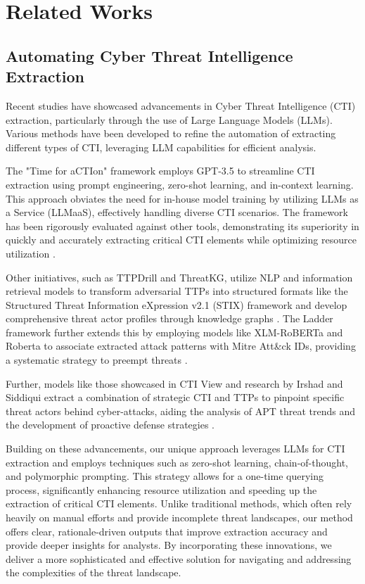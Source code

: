 \section{Related Works}
\label{sec:relatedworks}
\subsection{Automating Cyber Threat Intelligence Extraction}
Recent studies have showcased advancements in Cyber Threat Intelligence (CTI) extraction, particularly through the use of Large Language Models (LLMs). Various methods have been developed to refine the automation of extracting different types of CTI, leveraging LLM capabilities for efficient analysis.

The "Time for aCTIon" framework employs GPT-3.5 to streamline CTI extraction using prompt engineering, zero-shot learning, and in-context learning. This approach obviates the need for in-house model training by utilizing LLMs as a Service (LLMaaS), effectively handling diverse CTI scenarios. The framework has been rigorously evaluated against other tools, demonstrating its superiority in quickly and accurately extracting critical CTI elements while optimizing resource utilization \cite{aCTIon}.

Other initiatives, such as TTPDrill and ThreatKG, utilize NLP and information retrieval models to transform adversarial TTPs into structured formats like the Structured Threat Information eXpression  v2.1 (STIX) framework and develop comprehensive threat actor profiles through knowledge graphs \cite{TTPDrill, ThreatKG}. The Ladder framework further extends this by employing models like XLM-RoBERTa and Roberta to associate extracted attack patterns with Mitre Att\&ck IDs, providing a systematic strategy to preempt threats \cite{LADDER, mitre2023attack}.

Further, models like those showcased in CTI View and research by Irshad and Siddiqui extract a combination of strategic CTI and TTPs to pinpoint specific threat actors behind cyber-attacks, aiding the analysis of APT threat trends and the development of proactive defense strategies \cite{CtiView, Irshad2023}.

Building on these advancements, our unique approach leverages LLMs for CTI extraction and employs techniques such as zero-shot learning, chain-of-thought, and polymorphic prompting. This strategy allows for a one-time querying process, significantly enhancing resource utilization and speeding up the extraction of critical CTI elements. Unlike traditional methods, which often rely heavily on manual efforts and provide incomplete threat landscapes, our method offers clear, rationale-driven outputs that improve extraction accuracy and provide deeper insights for analysts. By incorporating these innovations, we deliver a more sophisticated and effective solution for navigating and addressing the complexities of the threat landscape.

